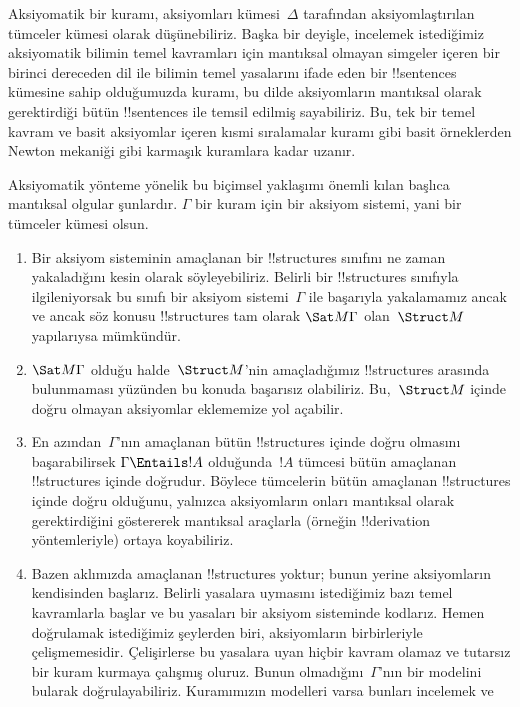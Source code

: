 \begin{explain}
Aksiyomatik bir kuramı, aksiyomları kümesi~$\Delta$ tarafından
aksiyomlaştırılan tümceler kümesi olarak düşünebiliriz. Başka bir
deyişle, incelemek istediğimiz aksiyomatik bilimin temel kavramları
için mantıksal olmayan simgeler içeren bir birinci dereceden dil ile
bilimin temel yasalarını ifade eden bir !!{sentence}s kümesine sahip
olduğumuzda kuramı, bu dilde aksiyomların mantıksal olarak gerektirdiği
bütün !!{sentence}s ile temsil edilmiş sayabiliriz. Bu, tek bir temel
kavram ve basit aksiyomlar içeren kısmi sıralamalar kuramı gibi basit
örneklerden Newton mekaniği gibi karmaşık kuramlara kadar uzanır.

Aksiyomatik yönteme yönelik bu biçimsel yaklaşımı önemli kılan başlıca
mantıksal olgular şunlardır. $\Gamma$ bir kuram için bir aksiyom
sistemi, yani bir tümceler kümesi olsun.
\begin{enumerate}
\item Bir aksiyom sisteminin amaçlanan bir !!{structure}s sınıfını ne
  zaman yakaladığını kesin olarak söyleyebiliriz. Belirli bir
  !!{structure}s sınıfıyla ilgileniyorsak bu sınıfı bir aksiyom
  sistemi~$\Gamma$ ile başarıyla yakalamamız ancak ve ancak söz konusu
  !!{structure}s tam olarak $\Sat M\Gamma$ olan~$\Struct M$ yapılarıysa
  mümkündür.
\item $\Sat M\Gamma$ olduğu halde~$\Struct M$'nin amaçladığımız
  !!{structure}s arasında bulunmaması yüzünden bu konuda başarısız
  olabiliriz. Bu,~$\Struct M$ içinde doğru olmayan aksiyomlar
  eklememize yol açabilir.
\item En azından~$\Gamma$'nın amaçlanan bütün !!{structure}s içinde
  doğru olmasını başarabilirsek $\Gamma\Entails !A$ olduğunda~$!A$
  tümcesi bütün amaçlanan !!{structure}s içinde doğrudur. Böylece
  tümcelerin bütün amaçlanan !!{structure}s içinde doğru olduğunu,
  yalnızca aksiyomların onları mantıksal olarak gerektirdiğini
  göstererek mantıksal araçlarla (örneğin !!{derivation} yöntemleriyle)
  ortaya koyabiliriz.
\item Bazen aklımızda amaçlanan !!{structure}s yoktur; bunun yerine
  aksiyomların kendisinden başlarız. Belirli yasalara uymasını
  istediğimiz bazı temel kavramlarla başlar ve bu yasaları bir aksiyom
  sisteminde kodlarız. Hemen doğrulamak istediğimiz şeylerden biri,
  aksiyomların birbirleriyle çelişmemesidir. Çelişirlerse bu yasalara
  uyan hiçbir kavram olamaz ve tutarsız bir kuram kurmaya çalışmış
  oluruz. Bunun olmadığını~$\Gamma$'nın bir modelini bularak
  doğrulayabiliriz. Kuramımızın modelleri varsa bunları incelemek ve

\end{enumerate}
\end{explain}
